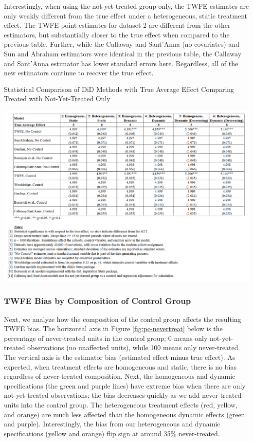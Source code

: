 \documentclass[12pt]{article}
\begin{document}
Interestingly, when using the not-yet-treated group only, the TWFE estimates are only weakly different from the true effect under a heterogeneous, static treatment effect. The TWFE point estimates for dataset 2 are different from the other estimators, but substantially closer to the true effect when compared to the previous table. Further, while the Callaway and Sant’Anna (no covariates) and Sun and Abraham estimators were identical in the previous table, the Callaway and Sant’Anna estimator has lower standard errors here. Regardless, all of the new estimators continue to recover the true effect.
\begin{table}[H]
    \centering
    \caption{Statistical Comparison of DiD Methods with True Average Effect
Comparing Treated with Not-Yet-Treated Only}
    \includegraphics[width=6in]{Figures/Table 2.png}
    \label{tab:estimators-notyet}
\end{table}
\subsubsection{TWFE Bias by Composition of Control Group}
Next, we analyze how the composition of the control group affects the resulting TWFE bias. The horizontal axis in Figure \ref{fig:pc-nevertreat} below is the percentage of never-treated units in the control group; 0 means only not-yet-treated observations (no unaffected units), while 100 means only never-treated. The vertical axis is the  estimator bias (estimated effect minus true effect). As expected, when treatment effects are homogeneous and static, there is no bias regardless of never-treated composition. Next, the homogeneous and dynamic specifications (the green and purple lines) have extreme bias when there are only not-yet-treated observations; the bias decreases quickly as we add never-treated units into the control group. The heterogeneous treatment effects (red, yellow, and orange) are much less affected than the homogeneous dynamic effects (green and purple). Interestingly, the bias from our heterogeneous and dynamic specifications (yellow and orange) flip sign at around 35\% never-treated.
\end{document}
